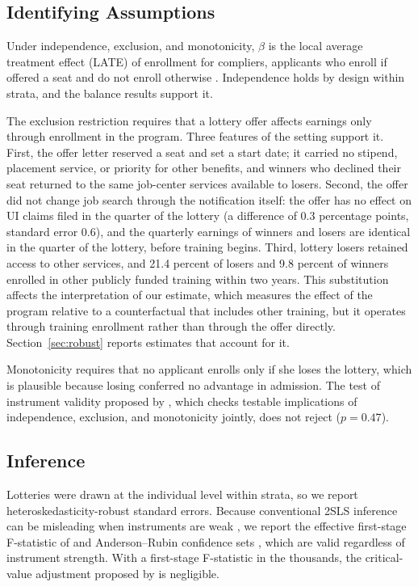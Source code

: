 \documentclass[12pt]{article}
\begin{document}
\subsection{Identifying Assumptions}

Under independence, exclusion, and monotonicity, $\beta$ is the local average treatment effect (LATE) of enrollment for compliers, applicants who enroll if offered a seat and do not enroll otherwise \citep{imbens1994,angrist1996}. Independence holds by design within strata, and the balance results support it.

The exclusion restriction requires that a lottery offer affects earnings only through enrollment in the program. Three features of the setting support it. First, the offer letter reserved a seat and set a start date; it carried no stipend, placement service, or priority for other benefits, and winners who declined their seat returned to the same job-center services available to losers. Second, the offer did not change job search through the notification itself: the offer has no effect on UI claims filed in the quarter of the lottery (a difference of 0.3 percentage points, standard error 0.6), and the quarterly earnings of winners and losers are identical in the quarter of the lottery, before training begins. Third, lottery losers retained access to other services, and 21.4 percent of losers and 9.8 percent of winners enrolled in other publicly funded training within two years. This substitution affects the interpretation of our estimate, which measures the effect of the program relative to a counterfactual that includes other training, but it operates through training enrollment rather than through the offer directly. Section~\ref{sec:robust} reports estimates that account for it.

Monotonicity requires that no applicant enrolls only if she loses the lottery, which is plausible because losing conferred no advantage in admission. The test of instrument validity proposed by \citet{kitagawa2015}, which checks testable implications of independence, exclusion, and monotonicity jointly, does not reject ($p = 0.47$).

\subsection{Inference}

Lotteries were drawn at the individual level within strata, so we report heteroskedasticity-robust standard errors. Because conventional 2SLS inference can be misleading when instruments are weak \citep{andrews2019}, we report the effective first-stage F-statistic of \citet{montielolea2013} and Anderson--Rubin confidence sets \citep{andersonrubin1949}, which are valid regardless of instrument strength. With a first-stage F-statistic in the thousands, the critical-value adjustment proposed by \citet{lee2022} is negligible.
\end{document}
